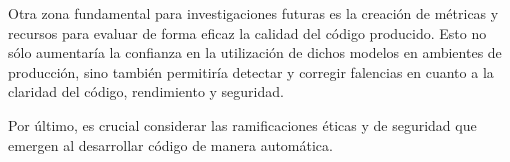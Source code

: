 \bigskip %

Otra zona fundamental para investigaciones futuras es la creación de métricas y recursos para evaluar de forma eficaz la calidad del código producido. Esto no sólo aumentaría la confianza en la utilización de dichos modelos en ambientes de producción, sino también permitiría detectar y corregir falencias en cuanto a la claridad del código, rendimiento y seguridad.

\bigskip %

Por último, es crucial considerar las ramificaciones éticas y de seguridad que emergen al desarrollar código de manera automática. 